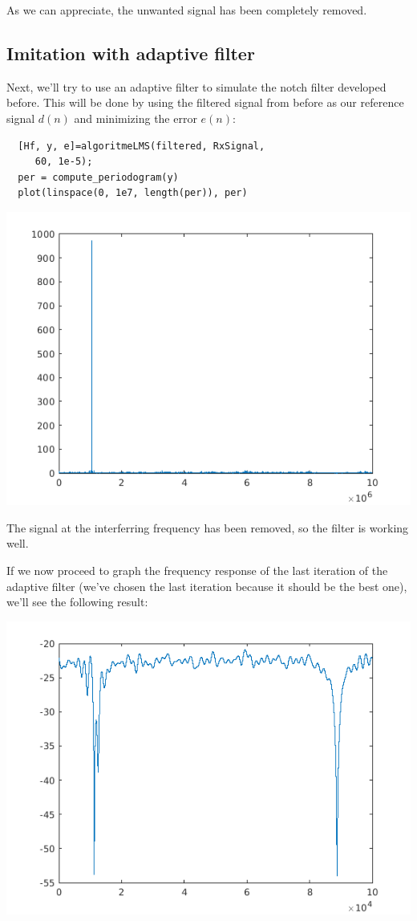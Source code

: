 \documentclass[conference,9pt]{IEEEtran}
\begin{document}
As we can appreciate, the unwanted signal has been completely removed.

\subsection{Imitation with adaptive filter}
Next, we'll try to use an adaptive filter to simulate the notch filter developed before. This will be done by using the filtered signal from before as our reference signal $d(n)$ and minimizing the error $e(n)$:

\begin{verbatim}
  [Hf, y, e]=algoritmeLMS(filtered, RxSignal,
     60, 1e-5);
  per = compute_periodogram(y)
  plot(linspace(0, 1e7, length(per)), per)
\end{verbatim}

\includegraphics[scale=0.6]{filtered-lms.png}

The signal at the interferring frequency has been removed, so the filter is working well.

If we now proceed to graph the frequency response of the last iteration of the adaptive filter (we've chosen the last iteration because it should be the best one), we'll see the following result:

\includegraphics[scale=0.6]{freq-response.png}
\end{document}
